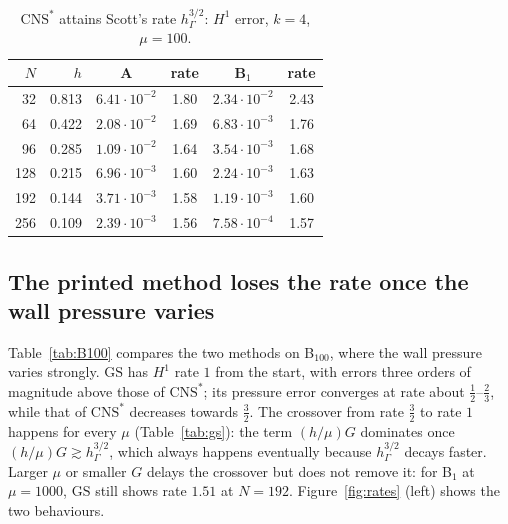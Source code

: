 \documentclass[pdflatex,sn-mathphys-num]{sn-jnl}
\theoremstyle{thmstyleone}
\theoremstyle{thmstylethree}
\newcommand{\hG}{h_\Gamma}
\newcommand{\GS}{\mathrm{GS}}
\newcommand{\CNS}{\mathrm{CNS}^\ast}
\begin{document}
\begin{table}[t]
\centering\small
\caption{$\CNS$ attains Scott's rate $\hG^{3/2}$: $H^1$ error, $k=4$, $\mu=100$.}\label{tab:cns}
\begin{tabular}{rrcccc}
\toprule
$N$ & $h$ & A & rate & B$_1$ & rate\\
\midrule
32 & 0.813 & $6.41\cdot10^{-2}$ & 1.80 & $2.34\cdot10^{-2}$ & 2.43\\
64 & 0.422 & $2.08\cdot10^{-2}$ & 1.69 & $6.83\cdot10^{-3}$ & 1.76\\
96 & 0.285 & $1.09\cdot10^{-2}$ & 1.64 & $3.54\cdot10^{-3}$ & 1.68\\
128 & 0.215 & $6.96\cdot10^{-3}$ & 1.60 & $2.24\cdot10^{-3}$ & 1.63\\
192 & 0.144 & $3.71\cdot10^{-3}$ & 1.58 & $1.19\cdot10^{-3}$ & 1.60\\
256 & 0.109 & $2.39\cdot10^{-3}$ & 1.56 & $7.58\cdot10^{-4}$ & 1.57\\
\bottomrule
\end{tabular}
\end{table}

\subsection{The printed method loses the rate once the wall pressure varies}
Table~\ref{tab:B100} compares the two methods on B$_{100}$, where the wall pressure varies strongly. $\GS$ has $H^1$ rate $1$ from the start, with errors three orders of magnitude above those of $\CNS$; its pressure error converges at rate about $\frac12$--$\frac23$, while that of $\CNS$ decreases towards $\frac32$. The crossover from rate $\frac32$ to rate $1$ happens for every $\mu$ (Table~\ref{tab:gs}): the term $(h/\mu)G$ dominates once $(h/\mu)G\gtrsim\hG^{3/2}$, which always happens eventually because $\hG^{3/2}$ decays faster. Larger $\mu$ or smaller $G$ delays the crossover but does not remove it: for B$_1$ at $\mu=1000$, $\GS$ still shows rate $1.51$ at $N=192$. Figure~\ref{fig:rates} (left) shows the two behaviours.
\end{document}
